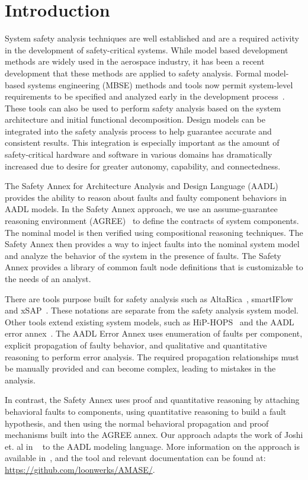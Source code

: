 \section{Introduction}
System safety analysis techniques are well established and are a required activity in the development of safety-critical systems. While model based development methods are widely used in the aerospace industry, it has been a recent development that these methods are applied to safety analysis. Formal model-based systems engineering (MBSE) methods and tools now permit system-level requirements to be specified and analyzed early in the development process~\cite{NFM2012:CoGaMiWhLaLu,CAV2015:BoCiGrMa}. These tools can also be used to perform safety analysis based on the system architecture and initial functional decomposition. Design models can be integrated into the safety analysis process to help guarantee accurate and consistent results. This integration is especially important as the amount of safety-critical hardware and software in various domains has dramatically increased due to desire for greater autonomy, capability, and connectedness.

The Safety Annex for Architecture Analysis and Design Language (AADL) provides the ability to reason about faults and faulty component behaviors in AADL models. In the Safety Annex approach, we use an assume-guarantee reasoning environment (AGREE)~\cite{NFM2012:CoGaMiWhLaLu} to define the contracts of system components. The nominal model is then verified using compositional reasoning techniques. The Safety Annex then provides a way to inject faults into the nominal system model and analyze the behavior of the system in the presence of faults. The Safety Annex provides a library of common fault node definitions that is customizable to the needs of an analyst.

There are tools purpose built for safety analysis such as AltaRica~\cite{PROSVIRNOVA2013127}, smartIFlow~\cite{info8010007} and xSAP~\cite{DBLP:conf/tacas/BittnerBCCGGMMZ16}. These notations are separate from the safety analysis system model. Other tools extend existing system models, such as HiP-HOPS~\cite{CHEN201391} and the AADL error annex~\cite{SAEAS}. The AADL Error Annex uses enumeration of faults per component, explicit propagation of faulty behavior, and qualitative and quantitative reasoning to perform error analysis. The required propagation relationships must be manually provided and can become complex, leading to mistakes in the analysis.

In contrast, the Safety Annex uses proof and quantitative reasoning by attaching behavioral faults to components, using quantitative reasoning to build a fault hypothesis, and then using the normal behavioral propagation and proof mechanisms built into the AGREE annex.  Our approach adapts the work of Joshi et. al in
~\cite{Joshi05:Dasc} to the AADL modeling language.  More information on the approach is available in~\cite{Stewart17:IMBSA}, and the tool and relevant documentation can be found at: \small \url{https://github.com/loonwerks/AMASE/}. \normalsize 